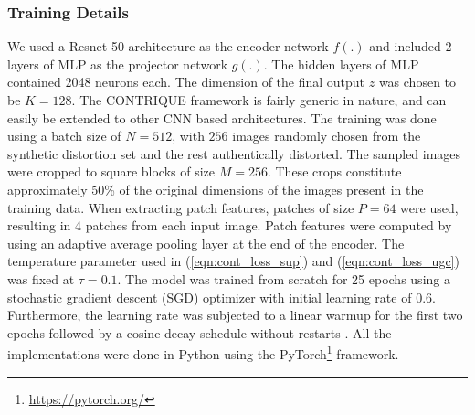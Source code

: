 \documentclass[journal]{IEEEtran}
\begin{document}
\subsubsection*{\textbf{Training Details}}
We used a Resnet-50 \cite{he2016deep} architecture as the encoder network $f(.)$ and included 2 layers of MLP as the projector network $g(.)$. The hidden layers of MLP contained 2048 neurons each. The dimension of the final output $z$ was chosen to be $K = 128$. The CONTRIQUE framework is fairly generic in nature, and can easily be extended to other CNN based architectures. The training was done using a batch size of $N = 512$, with $256$ images randomly chosen from the synthetic distortion set and the rest authentically distorted. The sampled images were cropped to square blocks of size $M = 256$. These crops constitute approximately 50\% of the original dimensions of the images present in the training data. When extracting patch features, patches of size $P = 64$ were used, resulting in 4 patches from each input image. Patch features were computed by using an adaptive average pooling layer at the end of the encoder. The temperature parameter used in (\ref{eqn:cont_loss_sup}) and (\ref{eqn:cont_loss_ugc}) was fixed at $\tau = 0.1$. The model was trained from scratch for 25 epochs using a stochastic gradient descent (SGD) optimizer with initial learning rate of $0.6$. Furthermore, the learning rate was subjected to a linear warmup for the first two epochs followed by a cosine decay schedule without restarts \cite{loshchilov2016sgdr}. All the implementations were done in Python using the PyTorch\footnote{\url{https://pytorch.org/}} framework.\\
 
\end{document}
